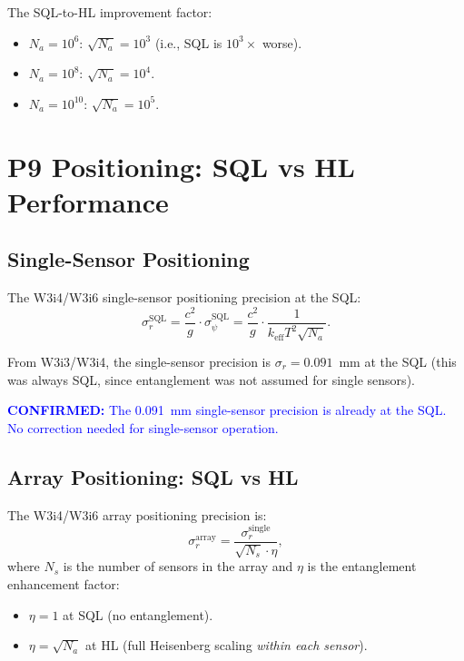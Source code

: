 \documentclass[11pt]{article}
\theoremstyle{definition}
\theoremstyle{remark}
\newcommand{\confirmed}[1]{\textcolor{blue}{\textbf{CONFIRMED:} #1}}
\begin{document}
The SQL-to-HL improvement factor:
\begin{itemize}[nosep]
\item $N_a = 10^6$: $\sqrt{N_a} = 10^3$ (i.e., SQL is $10^3\times$ worse).
\item $N_a = 10^8$: $\sqrt{N_a} = 10^4$.
\item $N_a = 10^{10}$: $\sqrt{N_a} = 10^5$.
\end{itemize}

\section{P9 Positioning: SQL vs HL Performance}
\label{sec:P9-SQL-performance}

\subsection{Single-Sensor Positioning}

The W3i4/W3i6 single-sensor positioning precision at the SQL:
\begin{equation}
\sigma_r^{\mathrm{SQL}} = \frac{c^2}{g} \cdot \sigma_\psi^{\mathrm{SQL}}
= \frac{c^2}{g} \cdot \frac{1}{k_{\mathrm{eff}} T^2 \sqrt{N_a}}.
\label{eq:sigma-r-SQL-single}
\end{equation}

From W3i3/W3i4, the single-sensor precision is $\sigma_r = 0.091$~mm
at the SQL (this was always SQL, since entanglement was not assumed for
single sensors).

\confirmed{The 0.091~mm single-sensor precision is already at the SQL.
No correction needed for single-sensor operation.}

\subsection{Array Positioning: SQL vs HL}

The W3i4/W3i6 array positioning precision is:
\begin{equation}
\sigma_r^{\mathrm{array}} = \frac{\sigma_r^{\mathrm{single}}}{\sqrt{N_s} \cdot \eta},
\label{eq:sigma-r-array}
\end{equation}
where $N_s$ is the number of sensors in the array and $\eta$ is the
entanglement enhancement factor:
\begin{itemize}[nosep]
\item $\eta = 1$ at SQL (no entanglement).
\item $\eta = \sqrt{N_a}$ at HL (full Heisenberg scaling \emph{within each sensor}).
\end{itemize}
\end{document}
